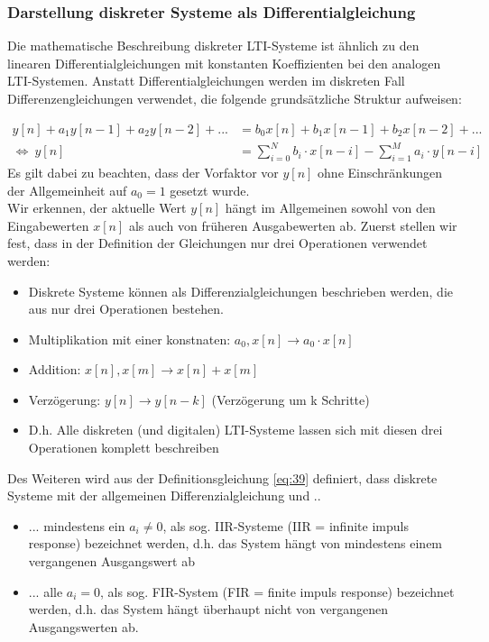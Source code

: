 \documentclass[12pt,a4paper]{scrartcl}
\begin{document}
  \subsubsection{Darstellung diskreter Systeme als Differentialgleichung}
  \label{sec:sub:sub:darstellung-diskreter-signale-differentialgleichung}

\noindent  Die mathematische Beschreibung diskreter LTI-Systeme ist ähnlich zu den linearen Differentialgleichungen mit konstanten Koeffizienten bei den analogen LTI-Systemen.
 Anstatt Differentialgleichungen werden im diskreten Fall Differenzengleichungen verwendet, die folgende grundsätzliche Struktur aufweisen: 

\begin{equation}
    \label{eq:39}
    \begin{split}
    y[n] + a_1 y[n-1] + a_2 y[n-2] + ... &= b_0 x[n] + b_1 x[n-1] + b_2 x[n-2] + ... \\
    \Leftrightarrow \ y[n] &= \sum_{i=0}^{N}b_i \cdot x[n-i] - \sum_{i = 1}^{M}a_i \cdot y[n-i]
    \end{split}
  \end{equation}
  Es gilt dabei zu beachten, dass der Vorfaktor vor $y[n]$ ohne Einschränkungen der Allgemeinheit auf $a_0 = 1$ gesetzt wurde. \\

  \noindent Wir erkennen, der aktuelle Wert $y[n]$ hängt im Allgemeinen sowohl von den Eingabewerten $x[n]$ als auch von früheren Ausgabewerten ab. Zuerst stellen wir fest, dass in der Definition der Gleichungen nur drei Operationen verwendet werden:
  \begin{itemize}
    \item Diskrete Systeme können als Differenzialgleichungen beschrieben werden, die aus nur drei Operationen bestehen.
    \item Multiplikation mit einer konstnaten: $a_0, x[n] \to a_0 \cdot x[n]$
    \item Addition: $x[n],x[m] \to x[n] + x[m]$
    \item Verzögerung: $y[n] \to y[n-k]$ (Verzögerung um k Schritte)
    \item D.h. Alle diskreten (und digitalen) LTI-Systeme lassen sich mit diesen drei Operationen komplett beschreiben
  \end{itemize}

  \noindent Des Weiteren wird aus der Definitionsgleichung \ref{eq:39} definiert, dass diskrete Systeme mit der allgemeinen Differenzialgleichung und ..
  \begin{itemize}
    \item ... mindestens ein $a_i \neq 0$, als sog. IIR-Systeme (IIR = infinite impuls response) bezeichnet werden, d.h. das System hängt von mindestens einem vergangenen Ausgangswert ab
    \item ... alle $a_i = 0$, als sog. FIR-System (FIR = finite impuls response) bezeichnet werden, d.h. das System hängt überhaupt nicht von vergangenen Ausgangswerten ab.
  \end{itemize}
\end{document}

